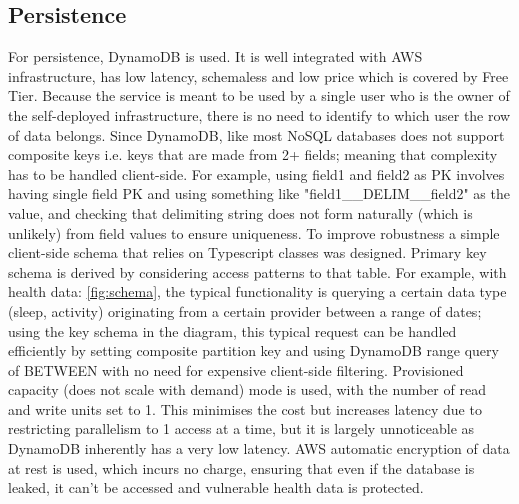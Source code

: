 \subsection{Persistence}
For persistence, DynamoDB is used. It is well integrated with AWS infrastructure, has low latency, schemaless and low price which is covered by Free Tier. Because the service is meant to be used by a single user who is the owner of the self-deployed infrastructure, there is no need to identify to which user the row of data belongs. Since DynamoDB, like most NoSQL databases does not support composite keys i.e. keys that are made from 2+ fields; meaning that complexity has to be handled client-side. For example, using field1 and field2 as PK involves having single field PK and using something like "field1\_\_DELIM\_\_field2" as the value, and checking that delimiting string does not form naturally (which is unlikely) from field values to ensure uniqueness. To improve robustness a simple client-side schema that relies on Typescript classes was designed. Primary key schema is derived by considering access patterns to that table. For example, with health data: \ref{fig:schema}, the typical functionality is querying a certain data type (sleep, activity) originating from a certain provider between a range of dates; using the key schema in the diagram, this typical request can be handled efficiently by setting composite partition key and using DynamoDB range query of BETWEEN with no need for expensive client-side filtering. Provisioned capacity (does not scale with demand) mode is used, with the number of read and write units set to 1. This minimises the cost but increases latency due to restricting parallelism to 1 access at a time, but it is largely unnoticeable as DynamoDB inherently has a very low latency. AWS automatic encryption of data at rest is used, which incurs no charge, ensuring that even if the database is leaked, it can't be accessed and vulnerable health data is protected.
